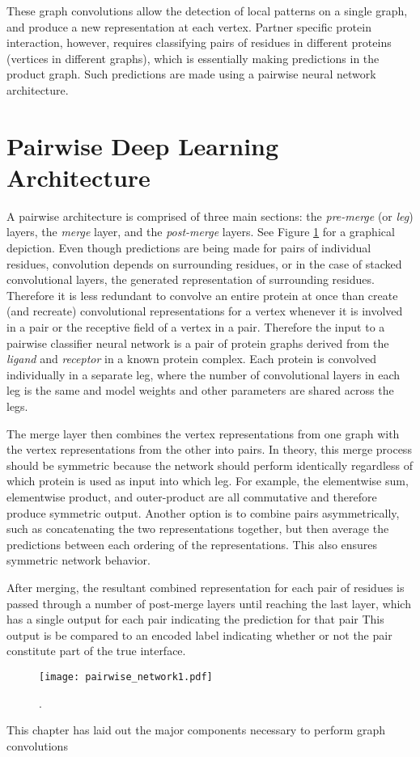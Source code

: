 These graph convolutions allow the detection of local patterns on a single graph, and produce a new representation at each vertex.
Partner specific protein interaction, however, requires classifying pairs of residues in different proteins (vertices in different graphs), which is essentially making predictions in the product graph. Such predictions are made using a pairwise neural network architecture.

\section{Pairwise Deep Learning Architecture}
A pairwise architecture is comprised of three main sections: the \textit{pre-merge} (or \textit{leg}) layers, the \textit{merge} layer, and the \textit{post-merge} layers.
See Figure \ref{fig:pairwise_arch1} for a graphical depiction.
Even though predictions are being made for pairs of individual residues, convolution depends on surrounding residues, or in the case of stacked convolutional layers, the generated representation of surrounding residues.
Therefore it is less redundant to convolve an entire protein at once than create (and recreate) convolutional representations for a vertex whenever it is involved in a pair or the receptive field of a vertex in a pair.
Therefore the input to a pairwise classifier neural network is a pair of protein graphs derived from the \textit{ligand} and \textit{receptor} in a known protein complex.
Each protein is convolved individually in a separate leg, where the number of convolutional layers in each leg is the same and model weights and other parameters are shared across the legs.

The merge layer then combines the vertex representations from one graph with the vertex representations from the other into pairs. 
In theory, this merge process should be symmetric because the network should perform identically regardless of which protein is used as input into which leg.
For example, the elementwise sum, elementwise product, and outer-product are all commutative and therefore produce symmetric output.
Another option is to combine pairs asymmetrically, such as concatenating the two representations together, but then average the predictions between each ordering of the representations.
This also ensures symmetric network behavior.

After merging, the resultant combined representation for each pair of residues is passed through a number of post-merge layers until reaching the last layer, which has a single output for each pair indicating the prediction for that pair
This output is be compared to an encoded label indicating whether or not the pair constitute part of the true interface. 

\begin{figure}
	\centering
	\texttt{[image: pairwise\_network1.pdf]}
	\caption{.}
	\label{fig:pairwise_arch1}
\end{figure}

This chapter has laid out the major components necessary to perform graph convolutions
